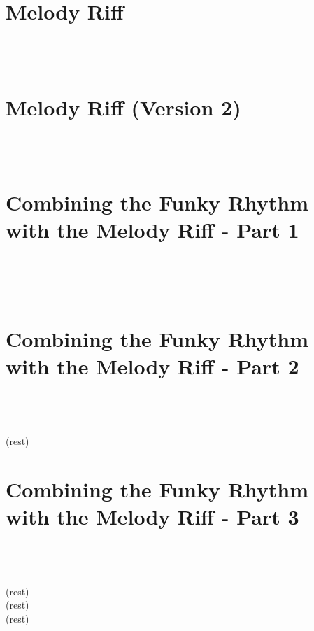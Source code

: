             \newpage
            
            
    \section{Melody Riff}
        \ffd \ffb \\
        \tfd \tfb \\
        \ttd 
        
    \section{Melody Riff (Version 2)}
        \ffd \ffb \\
        \tfd \tfb \\
        \textbf{\ottd }
            
\newpage
            
    \section{Combining the Funky Rhythm with the Melody Riff - Part 1}
            \spaceInvisDot
            \ffd \ffb \\
            \tfd \tfb \\
            \ottd \ottb \ottd \\  
            
    
    \section{Combining the Funky Rhythm with the Melody Riff - Part 2}
        \spaceInvisDot
        \ffd \ffb \\
        \tfd \tfb \\
        \ottd \ottb \ottd \\  
        (rest) \ottd \ottb \ottd \\    
    
\newpage

    \section{Combining the Funky Rhythm with the Melody Riff - Part 3}
        \spaceInvisDot
        \ffd \ffb \\
        \tfd \tfb \\
        \ottd \ottb \ottd \\  
        (rest) \ottd \ottb \ottd \\    
        (rest) \ottd \ottb \ottd \\    
        (rest) \ottd \ottb \ottd \\    
        
